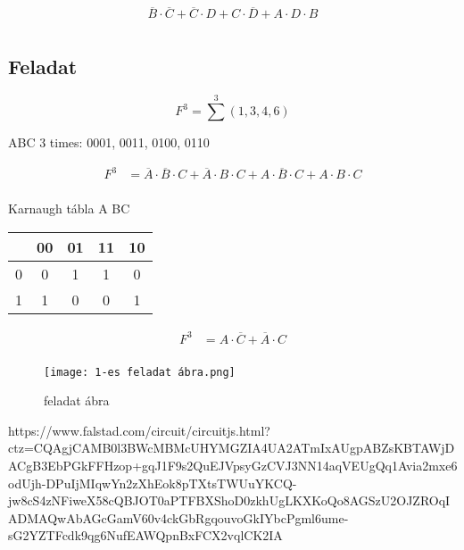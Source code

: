 \documentclass{article}
\begin{document}
\begin{align*}
    \overline{B} \cdot \overline{C} + \overline{C} \cdot D + C \cdot \overline{D} + A \cdot D \cdot B \\
\end{align*}

\subsection{Feladat}

\begin{equation*}
    F^3 = \sum^{3} (1, 3, 4, 6)
\end{equation*}

ABC 3 times: 0001, 0011, 0100, 0110

\begin{align*}
    F^3 & = \overline{A} \cdot \overline{B} \cdot C + \overline{A} \cdot B \cdot C + A \cdot \overline{B} \cdot C + A \cdot B \cdot C \\
\end{align*}

Karnaugh tábla
A BC

\begin{table}[ht]
    \begin{tabular}{c|c|c|c|c}
          & 00 & 01 & 11 & 10 \\
        \hline
        0 & 0  & 1  & 1  & 0  \\
        \hline
        1 & 1  & 0  & 0  & 1  \\
    \end{tabular}
\end{table}

\begin{align*}
    F^3 & = A \cdot \overline{C} + \overline{A} \cdot C \\
\end{align*}

\begin{figure}[ht]
    \centering
    \texttt{[image: 1-es feladat ábra.png]}
    \caption{feladat ábra}
    \label{fig:feladat ábra}
\end{figure}

https://www.falstad.com/circuit/circuitjs.html?ctz=CQAgjCAMB0l3BWcMBMcUHYMGZIA4UA2ATmIxAUgpABZsKBTAWjDACgB3EbPGkFFHzop+gqJ1F9s2QuEJVpsyGzCVJ3NN14aqVEUgQq1Avia2mxe6odUjh-DPuIjMIqwYn2zXhEok8pTXtsTWUuYKCQ-jw8cS4zNFiweX58cQBJOT0aPTFBXShoD0zkhUgLKXKoQo8AGSzU2OJZROqIADMAQwAbAGcGamV60v4ckGbRgqouvoGkIYbcPgml6ume-sG2YZTFcdk9qg6NufEAWQpnBxFCX2vqlCK2IA
\end{document}
